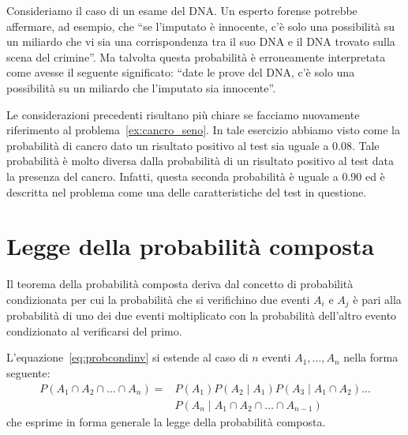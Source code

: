 Consideriamo il caso di un esame del DNA.
Un esperto forense potrebbe affermare, ad esempio, che \enquote{se l'imputato è innocente, c'è solo una possibilità su un miliardo che vi sia una corrispondenza tra il suo DNA e il DNA trovato sulla scena del crimine}. 
Ma talvolta questa probabilità è erroneamente interpretata come avesse il seguente significato: \enquote{date le prove del DNA, c'è solo una possibilità su un miliardo che l'imputato sia innocente}.

Le considerazioni precedenti risultano più chiare se facciamo nuovamente riferimento al problema~\ref{ex:cancro_seno}.
In tale esercizio abbiamo visto come la probabilità di cancro dato un risultato positivo al test sia uguale a 0.08. 
Tale probabilità è molto diversa dalla probabilità di un risultato positivo al test data la presenza del cancro.
Infatti, questa seconda probabilità è uguale a 0.90 ed è descritta nel problema come una delle caratteristiche del test in questione.


\section{Legge della probabilità composta}

Il teorema della probabilità composta deriva dal concetto di probabilità condizionata per cui la probabilità che si verifichino due eventi $A_i$ e $A_j$ è pari alla probabilità di uno dei due eventi moltiplicato con la probabilità dell'altro evento condizionato al verificarsi del primo. 
\begin{teorema}
L'equazione~\eqref{eq:probcondinv} si estende al caso di $n$ eventi $A_1, \dots, A_n$ nella forma seguente:
\begin{equation} 
\begin{split}
P(A_1 \cap A_2 \cap \dots\cap A_n) = {}& P(A_1)P(A_2 \mid A_1)P(A_3 \mid A_1 \cap A_2) \dots\\
 & P(A_n \mid A_1 \cap A_2 \cap \dots \cap A_{n-1})
\end{split}
\label{eq:probcomposte}
\end{equation}
che esprime in forma generale la legge della probabilità composta.
\end{teorema}

